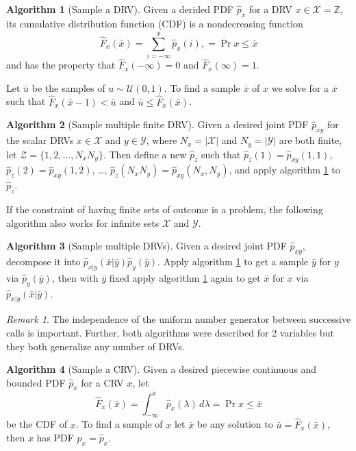 \documentclass[margin=small]{hsrzf}
\theoremstyle{plain}
\theoremstyle{definition}
\newtheorem{alg}{Algorithm}[section]
\theoremstyle{remark}
\newtheorem*{remark}{Remark}
\begin{document}
\begin{alg}[Sample a DRV] \label{alg:sample-drv}
  Given a derided PDF $\hat{p}_x$ for a DRV $x \in \mathcal{X} = \mathbb{Z}$,
  its cumulative distribution function (CDF) is a nondecreasing function
  \[
    \hat{F}_x (\bar{x}) = \sum_{i = -\infty}^{\bar{x}} \hat{p}_x (i),
    = \Pr{x \leq \bar{x}}
  \]
  and has the property that $\hat{F}_x(-\infty) = 0$ and $\hat{F}_x(\infty) =
  1$.

  Let $\bar{u}$ be the samples of $u \sim \mathcal{U}(0,1)$. To find
  a sample $\bar{x}$ of $x$ we solve for a $\bar{x}$ such that
  $\hat{F}_x(\bar{x} -1) < \bar{u}$ and $\bar{u} \leq \hat{F}_x(\bar{x})$.
\end{alg}

\begin{alg}[Sample multiple finite DRV]
  Given a desired joint PDF $\hat{p}_{xy}$ for the scalar DRVs $x \in
  \mathcal{X}$ and $y \in \mathcal{Y}$, where $N_x = |\mathcal{X}|$ and
  $N_y = |\mathcal{Y}|$ are both finite, let $\mathcal{Z} = \{1,2,\ldots,
  N_xN_y\}$. Then define a new $\hat{p}_z$ such that $\hat{p}_z(1) =
  \hat{p}_{xy}(1,1)$, $\hat{p}_z(2) = \hat{p}_{xy}(1,2)$, \dots,
  $\hat{p}_z(N_xN_y) = \hat{p}_{xy}(N_x, N_y)$, and apply algorithm
  \ref{alg:sample-drv} to $\hat{p}_z$.
\end{alg}

If the constraint of having finite sets of outcome is a problem, the following
algorithm also works for infinite sets $\mathcal{X}$ and $\mathcal{Y}$.

\begin{alg}[Sample multiple DRVs] \label{alg:sample-multiple-drvs}
  Given a desired joint PDF $\hat{p}_{xy}$, decompose it into
  $\hat{p}_{x|y}(\bar{x}|\bar{y}) \hat{p}_y(\bar{y})$. Apply algorithm
  \ref{alg:sample-drv} to get a sample $\bar{y}$ for $y$ via
  $\hat{p}_y(\bar{y})$, then with $\bar{y}$ fixed apply algorithm
  \ref{alg:sample-drv} again to get $\bar{x}$ for $x$ via
  $\hat{p}_{x|y}(\bar{x}|\bar{y})$.
\end{alg}

\begin{remark}
  The independence of the uniform number generator between successive calls is
  important. Further, both algorithms were described for 2 variables but they
  both generalize any number of DRVs.
\end{remark}

\begin{alg}[Sample a CRV] \label{alg:sample-crv}
  Given a desired piecewise continuous and bounded PDF $\hat{p}_x$ for a CRV
  $x$, let
  \[
    \hat{F}_x(\bar{x})
      = \int_{-\infty}^{\bar{x}} \hat{p}_x(\lambda) \, d\lambda
      = \Pr{x \leq \bar{x}}
  \]
  be the CDF of $x$. To find a sample of $x$ let $\bar{x}$ be any solution to
  $\bar{u} = \hat{F}_x(\bar{x})$, then $x$ has PDF $p_x = \hat{p}_x$.
\end{alg}
\end{document}
